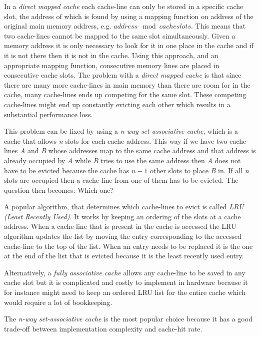 In a \textit{direct mapped cache} each cache-line can only be stored in a specific cache slot, the address of which is found by using a mapping function on address of the original main memory address, e.g. $address \mod cacheslots$.
This means that two cache-lines cannot be mapped to the same slot simultaneously.
Given a memory address it is only necessary to look for it in one place in the cache and if it is not there then it is not in the cache. Using this approach, and an appropriate mapping function, consecutive memory lines are placed in consecutive cache slots. 
The problem with a \textit{direct mapped cache} is that since there are many more cache-lines in main memory than there are room for in the cache, many cache-lines ends up competing for the same slot. 
These competing cache-lines might end up constantly evicting each other which results in a substantial performance loss.

This problem can be fixed by using a \textit{n-way set-associative cache}, which is a cache that allows \textit{n} slots for each cache address.
This way if we have two cache-lines \textit{A} and \textit{B} whose addresses map to the same cache address and that address is already occupied by \textit{A} while \textit{B} tries to use the same address then \textit{A} does not have to be evicted because the cache has $n-1$ other slots to place \textit{B} in.
If all \textit{n} slots are occupied then a cache-line from one of them has to be evicted.
The question then becomes: Which one?

A popular algorithm, that determines which cache-lines to evict is called \textit{LRU (Least Recently Used)}.
It works by keeping an ordering of the slots at a cache address.
When a cache-line that is present in the cache is accessed the LRU algorithm updates the list by moving the entry corresponding to the accessed cache-line to the top of the list.
When an entry needs to be replaced it is the one at the end of the list that is evicted because it is the least recently used entry.

Alternatively, a \textit{fully associative cache} allows any cache-line to be saved in any cache slot but it is complicated and costly to implement in hardware because it for instance  might need to keep an ordered LRU list for the entire cache which would require a lot of bookkeeping.

The \textit{n-way set-associative cache} is the most popular choice because it has a good trade-off between implementation complexity and cache-hit rate.


